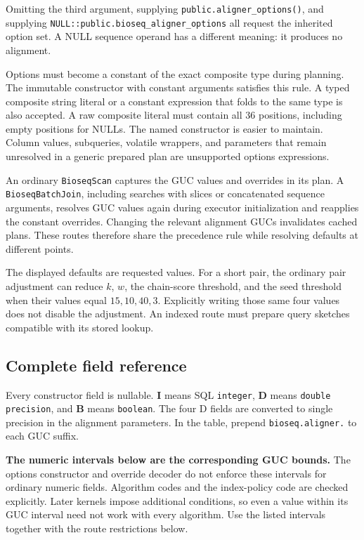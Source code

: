 Omitting the third argument, supplying \texttt{public.aligner\_options()},
and supplying \texttt{NULL::public.bioseq\_aligner\_options} all request
the inherited option set. A NULL sequence operand has a different meaning:
it produces no alignment.

Options must become a constant of the exact composite type during planning.
The immutable constructor with constant arguments satisfies this rule.
A typed composite string literal or a constant expression that folds to the
same type is also accepted. A raw composite literal must contain all 36
positions, including empty positions for NULLs. The named constructor is
easier to maintain. Column values, subqueries, volatile wrappers, and
parameters that remain unresolved in a generic prepared plan are unsupported
options expressions.

An ordinary \texttt{BioseqScan} captures the GUC values and overrides in its
plan. A \texttt{BioseqBatchJoin}, including searches with slices or
concatenated sequence arguments,
resolves GUC values again during executor initialization and reapplies the
constant overrides. Changing the relevant alignment GUCs invalidates cached
plans. These routes therefore share the precedence rule while resolving
defaults at different points.

The displayed defaults are requested values. For a short pair, the ordinary
pair adjustment can reduce $k$, $w$, the chain-score threshold, and the seed
threshold when their values equal $15,10,40,3$. Explicitly writing those same
four values does not disable the adjustment. An indexed route must prepare
query sketches compatible with its stored lookup.

\subsection{Complete field reference}
\label{sec:appendix-options-fields}

Every constructor field is nullable. \textbf{I} means SQL \texttt{integer},
\textbf{D} means \texttt{double precision}, and \textbf{B} means
\texttt{boolean}. The four D fields are converted to single precision in
the alignment parameters. In the table, prepend
\texttt{bioseq.aligner.} to each GUC suffix.

\textbf{The numeric intervals below are the corresponding GUC bounds.}
The options constructor and override decoder do not enforce these intervals
for ordinary numeric fields. Algorithm codes and the index-policy code are
checked explicitly. Later kernels impose additional conditions, so even a
value within its GUC interval need not work with every algorithm. Use the
listed intervals together with the route restrictions below.

